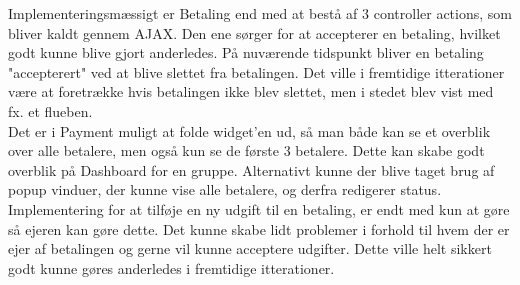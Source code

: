 Implementeringsmæssigt er Betaling end med at bestå af 3 controller actions, som bliver kaldt gennem AJAX. Den ene sørger for at accepterer en betaling, hvilket godt kunne blive gjort anderledes. På nuværende tidspunkt bliver en betaling "accepterert" ved at blive slettet fra betalingen. Det ville i fremtidige itterationer være at foretrække hvis betalingen ikke blev slettet, men i stedet blev vist med fx. et flueben.\\

\noindent Det er i Payment muligt at folde widget'en ud, så man både kan se et overblik over alle betalere, men også kun se de første 3 betalere. Dette kan skabe godt overblik på Dashboard for en gruppe. Alternativt kunne der blive taget brug af popup vinduer, der kunne vise alle betalere, og derfra redigerer status.\\

\noindent Implementering for at tilføje en ny udgift til en betaling, er endt med kun at gøre så ejeren kan gøre dette. Det kunne skabe lidt problemer i forhold til hvem der er ejer af betalingen og gerne vil kunne acceptere udgifter. Dette ville helt sikkert godt kunne gøres anderledes i fremtidige itterationer.\\



